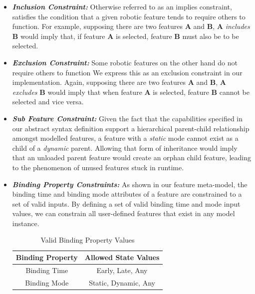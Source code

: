 \documentclass[conference]{IEEEtran}
\begin{document}
\begin{itemize}
    \item \textit{\textbf{Inclusion Constraint:}}
    Otherwise referred to as an implies constraint, satisfies the condition that a given robotic feature tends to require others to function. For example, supposing there are two features \textbf{A} and \textbf{B}, \textbf{A} \textit{includes} \textbf{B} would imply that, if feature \textbf{A} is selected, feature \textbf{B} must also be to be selected.
    
    \item \textit{\textbf{Exclusion Constraint:}}
    Some robotic features on the other hand do not require others to function We express this as an exclusion constraint in our implementation. Again, supposing there are two features \textbf{A} and \textbf{B}, \textbf{A} \textit{excludes} \textbf{B} would imply that when feature \textbf{A} is selected, feature \textbf{B} cannot be selected and vice versa.
    
    
    \item \textit{\textbf{Sub Feature Constraint:}}
    Given the fact that the capabilities specified in our abstract syntax definition support a hierarchical parent-child relationship amongst modelled features, a feature with a \textit{static} mode cannot exist as a child of a \textit{dynamic} parent. Allowing that form of inheritance would imply that an unloaded parent feature would create an orphan child feature, leading to the phenomenon of unused features stuck in runtime. 
    

\item \textit{\textbf{Binding Property Constraints:}}
As shown in our feature meta-model, the binding time and binding mode attributes of a feature are constrained to a set of valid inputs. By defining a set of valid binding time and mode input values, we can constrain all user-defined features that exist in any model instance.

\begin{table}[htbp]
\caption{Valid Binding Property Values}
\begin{center}
\begin{tabular}{c c}
\hline
    Binding Property & Allowed State Values  \\ \hline
    Binding Time & Early, Late, Any \\ \hline
    Binding Mode & Static, Dynamic, Any\\ \hline
\end{tabular}
\label{tab:bpropcon}
\end{center}
\end{table}


\end{itemize}
\end{document}
